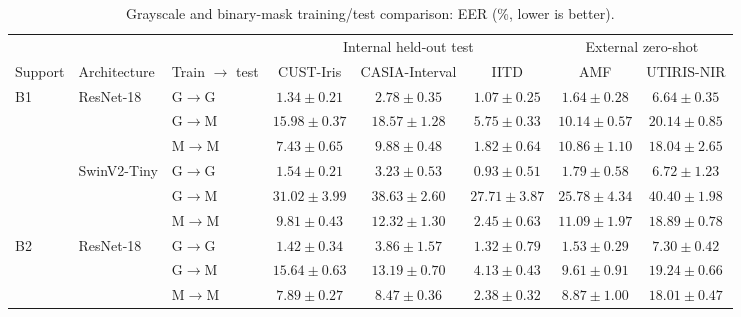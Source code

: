 
\begin{table}[!t]
\centering
\caption{Grayscale and binary-mask training/test comparison: EER (\%, lower is better).}
\label{tab:e3-gray-mask-eer}
\begingroup
\small
\setlength{\tabcolsep}{2.5pt}
\renewcommand{\arraystretch}{1.08}
\begin{tabular*}{\textwidth}{@{\extracolsep{\fill}}lllccccc@{}}
\toprule
& & & \multicolumn{3}{c}{Internal held-out test} & \multicolumn{2}{c}{External zero-shot} \\
\cmidrule(lr){4-6}\cmidrule(l){7-8}
Support & Architecture & Train $\to$ test & CUST-Iris & CASIA-Interval & IITD & AMF & UTIRIS-NIR \\
\midrule
\multirow{6}{*}{B1} & \multirow{3}{*}{ResNet-18} & G$\to$G & {\boldmath $1.34\pm0.21$} & {\boldmath $2.78\pm0.35$} & $1.07\pm0.25$ & {\boldmath $1.64\pm0.28$} & {\boldmath $6.64\pm0.35$} \\
 &  & G$\to$M & {\boldmath $15.98\pm0.37$} & {\boldmath $18.57\pm1.28$} & {\boldmath $5.75\pm0.33$} & {\boldmath $10.14\pm0.57$} & {\boldmath $20.14\pm0.85$} \\
 &  & M$\to$M & {\boldmath $7.43\pm0.65$} & {\boldmath $9.88\pm0.48$} & {\boldmath $1.82\pm0.64$} & {\boldmath $10.86\pm1.10$} & {\boldmath $18.04\pm2.65$} \\
\cmidrule(lr){2-8}
 & \multirow{3}{*}{SwinV2-Tiny} & G$\to$G & $1.54\pm0.21$ & $3.23\pm0.53$ & {\boldmath $0.93\pm0.51$} & $1.79\pm0.58$ & $6.72\pm1.23$ \\
 &  & G$\to$M & $31.02\pm3.99$ & $38.63\pm2.60$ & $27.71\pm3.87$ & $25.78\pm4.34$ & $40.40\pm1.98$ \\
 &  & M$\to$M & $9.81\pm0.43$ & $12.32\pm1.30$ & $2.45\pm0.63$ & $11.09\pm1.97$ & $18.89\pm0.78$ \\
\midrule
\multirow{6}{*}{B2} & \multirow{3}{*}{ResNet-18} & G$\to$G & {\boldmath $1.42\pm0.34$} & $3.86\pm1.57$ & $1.32\pm0.79$ & $1.53\pm0.29$ & $7.30\pm0.42$ \\
 &  & G$\to$M & {\boldmath $15.64\pm0.63$} & {\boldmath $13.19\pm0.70$} & {\boldmath $4.13\pm0.43$} & {\boldmath $9.61\pm0.91$} & {\boldmath $19.24\pm0.66$} \\
 &  & M$\to$M & {\boldmath $7.89\pm0.27$} & {\boldmath $8.47\pm0.36$} & {\boldmath $2.38\pm0.32$} & {\boldmath $8.87\pm1.00$} & {\boldmath $18.01\pm0.47$} \\

\end{tabular*}
\end{table}
